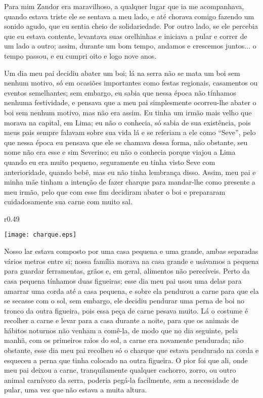 Para mim Zandor era maravilhoso, a qualquer lugar que ia me acompanhava, quando estava triste ele se sentava a meu lado, e até chorava comigo fazendo um sonido agudo, que eu sentia cheio de solidariedade. 
Por outro lado, se ele percebia que eu estava contente, levantava suas orelhinhas e iniciava a pular e correr de um lado a outro; assim, durante um bom tempo, andamos e crescemos juntos... o tempo passou, e eu cumpri oito e logo nove anos.

Um dia meu pai decidiu abater um boi; lá na serra não se mata um boi sem nenhum motivo, só em ocasiões importantes como festas regionais, casamentos ou eventos semelhantes; sem embargo, eu sabia que nessa época não tínhamos nenhuma festividade, e pensava que a meu pai simplesmente ocorreu-lhe abater o boi sem nenhum motivo, mas não era assim. 
Eu tinha um irmão mais velho que morava na capital, em Lima; eu não o conhecia, só sabia de sua existência, pois meus pais sempre falavam sobre sua vida lá e se referiam a ele como ``Seve'', pelo que nessa época eu pensava que ele se chamava dessa forma, não obstante, seu nome não era esse e sim Severino; eu não o conhecia porque viajou a Lima quando eu era muito pequeno, seguramente eu tinha visto Seve com anterioridade, quando bebê, mas eu não tinha lembrança disso. 
Assim, meu pai e minha mãe tinham a intenção de fazer charque para mandar-lhe como presente a meu irmão, pelo que com esse fim decidiram abater o boi e prepararam cuidadosamente sua carne com muito sal.

\begin{wrapfigure}{r}{0.49\textwidth}
  \begin{center}
  \vspace{-20pt}
    \texttt{[image: charque.eps]}
  \end{center}
  \vspace{-20pt}
\end{wrapfigure}
Nosso lar estava composto por uma casa pequena e uma grande, ambas separadas vários metros entre si; nossa família morava na casa grande e usávamos a pequena para guardar ferramentas, grãos e, em geral, alimentos não perecíveis. Perto da casa pequena tínhamos duas figueiras; esse dia meu pai usou uma delas para amarrar uma corda até a casa pequena, e sobre ela pendurou a carne para que ela se secasse com o sol, sem embargo, ele decidiu pendurar uma perna de boi no tronco da outra figueira, pois essa peça de carne pesava muito.
Lá o costume é recolher a carne e levar para a casa durante a noite, para que os animais de hábitos noturnos não venham a comê-la, de modo que no dia seguinte, pela manhã, com os primeiros raios do sol, a carne era novamente pendurada; não obstante, esse dia meu pai recolheu só o charque que estava pendurado na corda e esqueceu a perna que tinha colocado na outra figueira. 
O pior foi que ali, onde meu pai deixou a carne, tranquilamente qualquer cachorro, zorro, ou outro animal carnívoro da serra, poderia pegá-la facilmente, sem a necessidade de pular, uma vez que não estava a muita altura.

